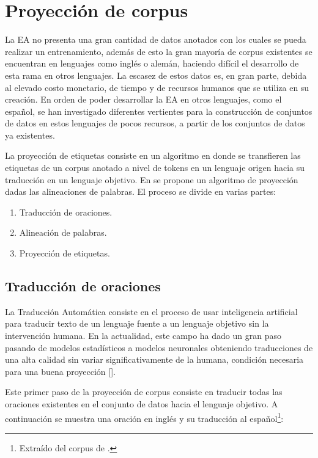 \section{Proyección de corpus}

La EA no presenta una gran cantidad de datos anotados con los cuales se pueda realizar 
un entrenamiento, además de esto la gran mayoría de corpus existentes se encuentran en lenguajes como inglés o alemán,
haciendo difícil el desarrollo de esta rama en otros lenguajes.
La escasez de estos datos es, en gran parte, debida al elevado costo monetario, de tiempo y de recursos humanos que se utiliza
en su creación. En orden de poder desarrollar la EA en otros lenguajes, como el español, se han investigado diferentes vertientes
para la construcción de conjuntos de datos en estos lenguajes de pocos recursos, a partir de los conjuntos de datos ya 
existentes.

La proyección de etiquetas consiste en un algoritmo en donde se 
transfieren las etiquetas de un corpus anotado a nivel de tokens en un lenguaje origen hacia su traducción en un
lenguaje objetivo. En \textcite{eger2018cross} se propone un algoritmo de proyección dadas las alineaciones de 
palabras. El proceso se divide en varias partes:

\begin{enumerate}
	\item Traducción de oraciones.
	\item Alineación de palabras.
	\item Proyección de etiquetas.
\end{enumerate}

\subsection{Traducción de oraciones}

La Traducción Automática consiste en el proceso de usar inteligencia artificial para
traducir texto de un lenguaje fuente a un lenguaje objetivo sin la intervención humana.
En la actualidad, este campo ha dado un gran paso pasando de modelos estadísticos a modelos
neuronales obteniendo traducciones de una alta calidad sin variar significativamente de la humana, 
condición necesaria para una buena proyección [\cite{eger2018cross}].

Este primer paso de la proyección de corpus consiste en traducir todas las oraciones existentes 
en el conjunto de datos hacia el lenguaje objetivo. 
A continuación se muestra una oración en inglés y su traducción al español\footnote{Extraído del corpus de \textcite{stab2017parsing}.}:

